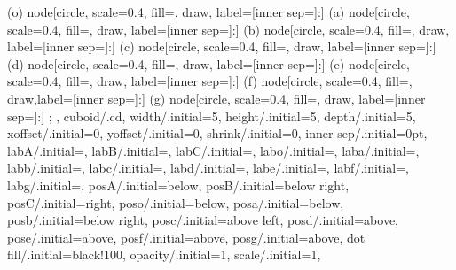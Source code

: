 {{{         %
         (o) node[circle, scale=0.4, fill=, draw, label={[inner sep=]:}] {}
         (a) node[circle, scale=0.4, fill=, draw, label={[inner sep=]:}] {}
         (b) node[circle, scale=0.4, fill=, draw, label={[inner sep=]:}] {}
         (c) node[circle, scale=0.4, fill=, draw, label={[inner sep=]:}] {}
         (d) node[circle, scale=0.4, fill=, draw, label={[inner sep=]:}] {}
         (e) node[circle, scale=0.4, fill=, draw, label={[inner sep=]:}] {}
         (f) node[circle, scale=0.4, fill=, draw,label={[inner sep=]:}] {}
         (g) node[circle, scale=0.4, fill=, draw, label={[inner sep=]:}] {}
    ;
  }},
  cuboid/.cd,
  width/.initial=5,
  height/.initial=5,
  depth/.initial=5,
  xoffset/.initial=0,
  yoffset/.initial=0,
  shrink/.initial=0,
  inner sep/.initial=0pt,
  labA/.initial=,
  labB/.initial=,
  labC/.initial=,
  labo/.initial=,
  laba/.initial=,
  labb/.initial=,
  labc/.initial=,
  labd/.initial=,
  labe/.initial=,
  labf/.initial=,
  labg/.initial=,
  posA/.initial=below,
  posB/.initial=below right,
  posC/.initial=right,
  poso/.initial=below,
  posa/.initial=below,
  posb/.initial=below right,
  posc/.initial=above left,
  posd/.initial=above,
  pose/.initial=above,
  posf/.initial=above,
  posg/.initial=above,
  dot fill/.initial=black!100,
  opacity/.initial=1,
  scale/.initial=1,
}